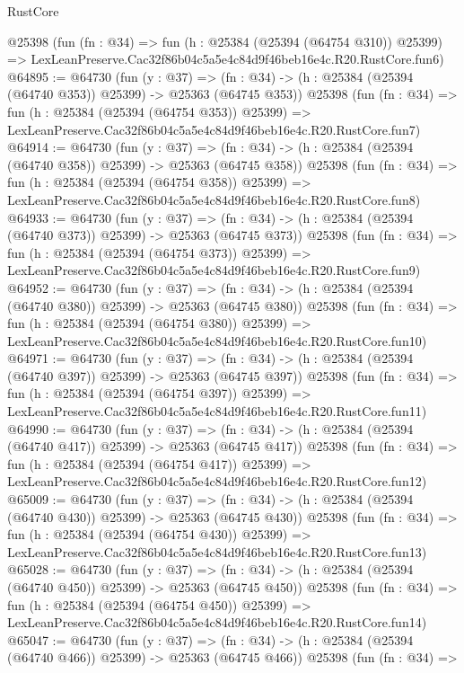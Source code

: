 \begin{lexlean}{RustCore}
\begin{coremodule}
    @25398
    (fun (fn : @34) =>
    fun (h : @25384 (@25394 (@64754 @310)) @25399) =>
    LexLeanPreserve.Cac32f86b04c5a5e4c84d9f46beb16e4c.R20.RustCore.fun6)
@64895 := @64730
    (fun (y : @37) =>
    (fn : @34) -> (h : @25384 (@25394 (@64740 @353)) @25399) -> @25363 (@64745 @353))
    @25398
    (fun (fn : @34) =>
    fun (h : @25384 (@25394 (@64754 @353)) @25399) =>
    LexLeanPreserve.Cac32f86b04c5a5e4c84d9f46beb16e4c.R20.RustCore.fun7)
@64914 := @64730
    (fun (y : @37) =>
    (fn : @34) -> (h : @25384 (@25394 (@64740 @358)) @25399) -> @25363 (@64745 @358))
    @25398
    (fun (fn : @34) =>
    fun (h : @25384 (@25394 (@64754 @358)) @25399) =>
    LexLeanPreserve.Cac32f86b04c5a5e4c84d9f46beb16e4c.R20.RustCore.fun8)
@64933 := @64730
    (fun (y : @37) =>
    (fn : @34) -> (h : @25384 (@25394 (@64740 @373)) @25399) -> @25363 (@64745 @373))
    @25398
    (fun (fn : @34) =>
    fun (h : @25384 (@25394 (@64754 @373)) @25399) =>
    LexLeanPreserve.Cac32f86b04c5a5e4c84d9f46beb16e4c.R20.RustCore.fun9)
@64952 := @64730
    (fun (y : @37) =>
    (fn : @34) -> (h : @25384 (@25394 (@64740 @380)) @25399) -> @25363 (@64745 @380))
    @25398
    (fun (fn : @34) =>
    fun (h : @25384 (@25394 (@64754 @380)) @25399) =>
    LexLeanPreserve.Cac32f86b04c5a5e4c84d9f46beb16e4c.R20.RustCore.fun10)
@64971 := @64730
    (fun (y : @37) =>
    (fn : @34) -> (h : @25384 (@25394 (@64740 @397)) @25399) -> @25363 (@64745 @397))
    @25398
    (fun (fn : @34) =>
    fun (h : @25384 (@25394 (@64754 @397)) @25399) =>
    LexLeanPreserve.Cac32f86b04c5a5e4c84d9f46beb16e4c.R20.RustCore.fun11)
@64990 := @64730
    (fun (y : @37) =>
    (fn : @34) -> (h : @25384 (@25394 (@64740 @417)) @25399) -> @25363 (@64745 @417))
    @25398
    (fun (fn : @34) =>
    fun (h : @25384 (@25394 (@64754 @417)) @25399) =>
    LexLeanPreserve.Cac32f86b04c5a5e4c84d9f46beb16e4c.R20.RustCore.fun12)
@65009 := @64730
    (fun (y : @37) =>
    (fn : @34) -> (h : @25384 (@25394 (@64740 @430)) @25399) -> @25363 (@64745 @430))
    @25398
    (fun (fn : @34) =>
    fun (h : @25384 (@25394 (@64754 @430)) @25399) =>
    LexLeanPreserve.Cac32f86b04c5a5e4c84d9f46beb16e4c.R20.RustCore.fun13)
@65028 := @64730
    (fun (y : @37) =>
    (fn : @34) -> (h : @25384 (@25394 (@64740 @450)) @25399) -> @25363 (@64745 @450))
    @25398
    (fun (fn : @34) =>
    fun (h : @25384 (@25394 (@64754 @450)) @25399) =>
    LexLeanPreserve.Cac32f86b04c5a5e4c84d9f46beb16e4c.R20.RustCore.fun14)
@65047 := @64730
    (fun (y : @37) =>
    (fn : @34) -> (h : @25384 (@25394 (@64740 @466)) @25399) -> @25363 (@64745 @466))
    @25398
    (fun (fn : @34) =>

\end{coremodule}
\end{lexlean}

